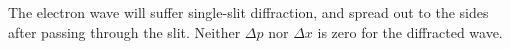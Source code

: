The electron wave will suffer single-slit diffraction, and spread out
to the sides after passing through the slit. Neither $\Delta p$ nor
$\Delta x$ is zero for the diffracted wave.



